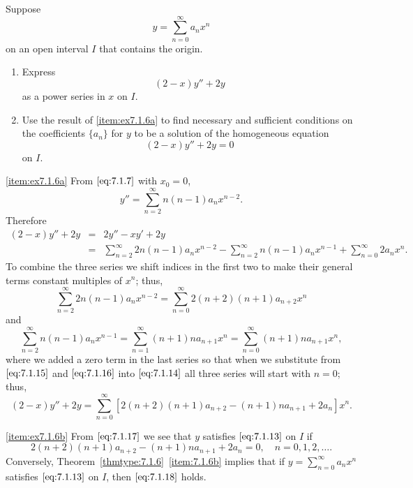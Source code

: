 \documentclass{ximera}
\begin{document}
\begin{example}\label{example:7.1.6}
Suppose
$$
y=\sum_{n=0}^\infty a_n x^n
$$
 on an open interval $I$ that contains the origin.
\begin{enumerate}
\item\label{item:ex7.1.6a} %
Express
$$
(2-x)y''+2y
$$
as a power series in $x$ on $I$.
\item\label{item:ex7.1.6b} %
Use the result of \ref{item:ex7.1.6a} to find necessary and sufficient conditions
on the coefficients $\{a_n\}$ for
 $y$ to be  a solution of the homogeneous equation
\begin{equation} \label{eq:7.1.13}
(2-x)y''+2y=0
\end{equation}
on $I$.
\end{enumerate}

\begin{explanation}
\ref{item:ex7.1.6a}
From $\eqref{eq:7.1.7}$ with $x_0=0$,
$$
y''=\sum_{n=2}^\infty n(n-1)a_nx^{n-2}.
$$
Therefore
\begin{equation} \label{eq:7.1.14}
\begin{array}{rcl}
(2-x)y''+2y&=&2y''-xy'+2y\\
&=&\sum_{n=2}^\infty 2n(n-1)a_nx^{n-2}
-\sum_{n=2}^\infty n(n-1)a_nx^{n-1}
+\sum_{n=0}^\infty 2a_n x^n.
\end{array}
\end{equation}
To combine the three series we  shift indices in the first two to
make their general terms  constant multiples of $x^n$;   thus,
\begin{equation} \label{eq:7.1.15}
\sum_{n=2}^\infty
2n(n-1)a_nx^{n-2}=\sum_{n=0}^\infty2(n+2)(n+1)a_{n+2}x^n
\end{equation}
and
\begin{equation} \label{eq:7.1.16}
\sum_{n=2}^\infty n(n-1)a_nx^{n-1}=\sum_{n=1}^\infty(n+1)na_{n+1}x^n
=\sum_{n=0}^\infty(n+1)na_{n+1}x^n,
\end{equation}
where we added a zero term in the last series so that when we
substitute from $\eqref{eq:7.1.15}$ and $\eqref{eq:7.1.16}$ into $\eqref{eq:7.1.14}$
all three series will start with $n=0$; thus,
\begin{equation} \label{eq:7.1.17}
(2-x)y''+2y=\sum_{n=0}^\infty
[2(n+2)(n+1)a_{n+2}-(n+1)na_{n+1}+2a_n]x^n.
\end{equation}

\ref{item:ex7.1.6b} From   $\eqref{eq:7.1.17}$
we see that $y$ satisfies $\eqref{eq:7.1.13}$ on $I$ if
\begin{equation} \label{eq:7.1.18}
2(n+2)(n+1)a_{n+2}-(n+1)na_{n+1}+2a_n=0,\quad n=0,1,2, \dots.
\end{equation}
Conversely, Theorem~\ref{thmtype:7.1.6}~\ref{item:7.1.6b} implies that if
$y=\sum_{n=0}^\infty a_nx^n$
satisfies $\eqref{eq:7.1.13}$ on $I$,  then $\eqref{eq:7.1.18}$ holds.
\end{explanation}
\end{example}
\end{document}
